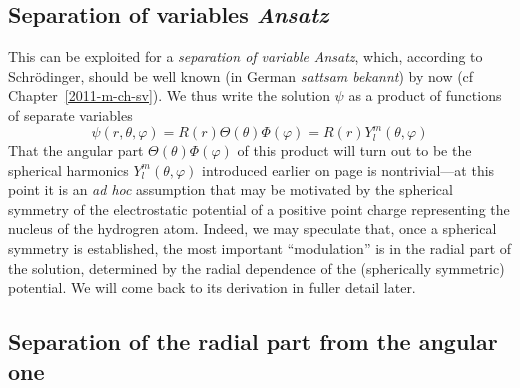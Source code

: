 \subsection{Separation of variables {\it Ansatz}}

This can be exploited for a
{\em separation of variable} {\it Ansatz},
which, according to  Schr\"odinger, should be well known
(in German {\em sattsam bekannt})
by now (cf Chapter~\ref{2011-m-ch-sv}).
We thus write the solution $\psi$ as a product of functions
of separate variables
\begin{equation}
\psi (r, \theta ,\varphi )=R(r)\Theta(\theta)\Phi(\varphi) = R(r)Y_l^m ( \theta ,\varphi )
\label{2011-m-ch-qaesva}
\end{equation}
That the angular part $\Theta(\theta)\Phi(\varphi)$ of this product
will turn out to be
the spherical harmonics $Y_l^m ( \theta ,\varphi )$  introduced earlier
on page  \pageref{2011-m-ch-sfshar}
is nontrivial---at this point it is an {\em ad hoc} assumption
that may be motivated by the spherical symmetry of the electrostatic potential of a positive point charge representing the nucleus of the hydrogren atom.
Indeed, we may speculate that, once a spherical symmetry is established, the most important ``modulation''
is in the radial part of the solution, determined by the radial dependence of the (spherically symmetric) potential.
We will come back to its derivation in fuller detail later.

\subsection{Separation of the radial part from the angular one}

